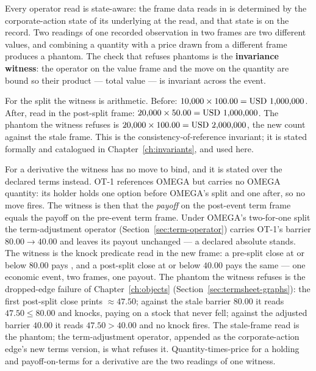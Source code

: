 Every operator read is state-aware: the frame data reads in is determined by the
corporate-action state of its underlying at the read, and that state is on the record. Two
readings of one recorded observation in two frames are two different values, and combining a
quantity with a price drawn from a different frame produces a phantom. The check that
refuses phantoms is the \textbf{invariance witness}: the operator on the value frame and
the move on the quantity are bound so their product --- total value --- is invariant across
the event.

For the split the witness is arithmetic. Before: $10{,}000 \times 100.00 = \mbox{USD~1{,}000{,}000}$.
After, read in the post-split frame: $20{,}000 \times 50.00 = \mbox{USD~1{,}000{,}000}$. The
phantom the witness refuses is $20{,}000 \times 100.00 = \mbox{USD~2{,}000{,}000}$, the new count
against the stale frame. This is the consistency-of-reference invariant; it is stated
formally and catalogued in Chapter~\ref{ch:invariants}, and used here.

For a derivative the witness has no move to bind, and it is stated over the declared terms
instead. OT-1 references OMEGA but carries no OMEGA quantity: its holder holds one option
before OMEGA's split and one after, so no move fires. The witness is then that the
\emph{payoff} on the post-event term frame equals the payoff on the pre-event term frame.
Under OMEGA's two-for-one split the term-adjustment operator (Section~\ref{sec:term-operator})
carries OT-1's barrier $80.00 \rightarrow 40.00$ and leaves its  payout
unchanged --- a declared absolute stands. The witness is the knock predicate read in the new
frame: a pre-split close at or below $80.00$ pays , and a post-split close
at or below $40.00$ pays the same  --- one economic event, two frames, one
payout. The phantom the witness refuses is the dropped-edge failure of Chapter~\ref{ch:objects}
(Section~\ref{sec:termsheet-graphs}): the first post-split close prints $\approx 47.50$;
against the stale barrier $80.00$ it reads $47.50 \le 80.00$ and knocks, paying
 on a stock that never fell; against the adjusted barrier $40.00$ it reads
$47.50 > 40.00$ and no knock fires. The stale-frame read is the phantom; the term-adjustment
operator, appended as the corporate-action edge's new terms version, is what refuses it.
Quantity-times-price for a holding and payoff-on-terms for a derivative are the two readings of
one witness.

